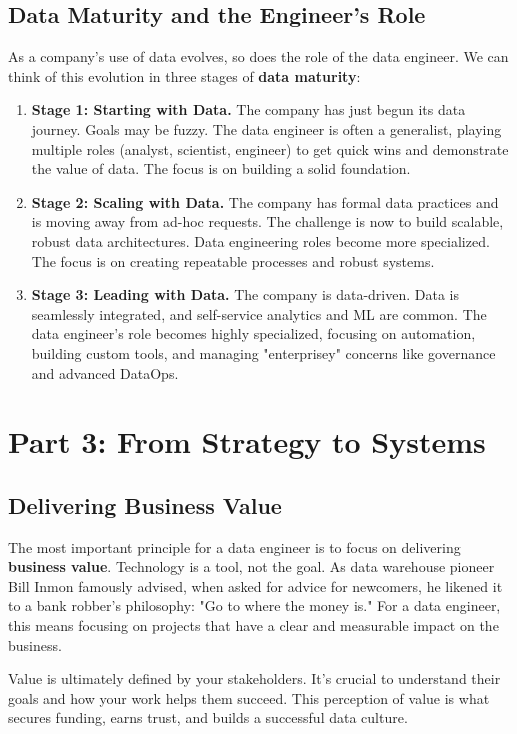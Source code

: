 \documentclass{article}
\begin{document}
\subsection{Data Maturity and the Engineer's Role}
As a company's use of data evolves, so does the role of the data engineer. We can think of this evolution in three stages of \textbf{data maturity}:
\begin{enumerate}
    \item \textbf{Stage 1: Starting with Data.} The company has just begun its data journey. Goals may be fuzzy. The data engineer is often a generalist, playing multiple roles (analyst, scientist, engineer) to get quick wins and demonstrate the value of data. The focus is on building a solid foundation.
    \item \textbf{Stage 2: Scaling with Data.} The company has formal data practices and is moving away from ad-hoc requests. The challenge is now to build scalable, robust data architectures. Data engineering roles become more specialized. The focus is on creating repeatable processes and robust systems.
    \item \textbf{Stage 3: Leading with Data.} The company is data-driven. Data is seamlessly integrated, and self-service analytics and ML are common. The data engineer's role becomes highly specialized, focusing on automation, building custom tools, and managing "enterprisey" concerns like governance and advanced DataOps.
\end{enumerate}

\newpage

\section{Part 3: From Strategy to Systems}

\subsection{Delivering Business Value}
The most important principle for a data engineer is to focus on delivering \textbf{business value}. Technology is a tool, not the goal. As data warehouse pioneer Bill Inmon famously advised, when asked for advice for newcomers, he likened it to a bank robber's philosophy: "Go to where the money is." For a data engineer, this means focusing on projects that have a clear and measurable impact on the business.

Value is ultimately defined by your stakeholders. It's crucial to understand their goals and how your work helps them succeed. This perception of value is what secures funding, earns trust, and builds a successful data culture.
\end{document}
